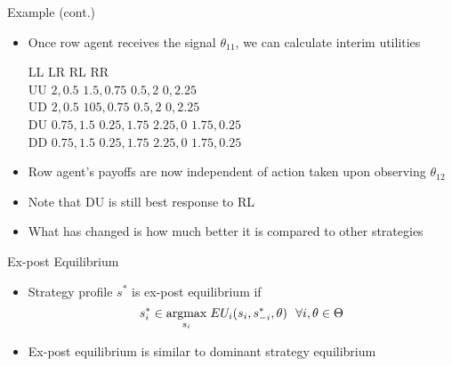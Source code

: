 \documentclass[11pt,aspectratio=169]{beamer}
\begin{document}
  
  \begin{frame}{Example (cont.)}
   \begin{itemize}[<+->]
    \item Once row agent receives the signal $\theta_{11}$, we can calculate interim utilities
    \vspace{1em}
    \begin{center}\small
     \hspace{-4.9em}
     \begin{game}{4}{4}
      	\> LL			\> LR		\> RL		\> RR		\\
      UU	\> $2,0.5$		\> $1.5,0.75$	\> $0.5,2$	\> $0,2.25$	\\
      UD	\> $2,0.5$		\> $105,0.75$ 	\> $0.5,2$	\> $0,2.25$	\\
      DU	\> $0.75,1.5$	\> $0.25,1.75$	\> $2.25,0$	\> $1.75,0.25$	\\
      DD	\> $0.75,1.5$	\> $0.25,1.75$	\> $2.25,0$	\> $1.75,0.25$	\\
     \end{game}
    \end{center}
    \vspace{1em}
    \item Row agent's payoffs are now \alert{independent} of action taken upon observing $\theta_{12}$
    \item Note that DU is \alert{still best response} to RL
    \item What has changed is how much better it is compared to other strategies
   \end{itemize}
  \end{frame}


  \begin{frame}{Ex-post Equilibrium}
    \begin{itemize}[<+->]
    \setlength{\itemsep}{1.2em}
     \item Strategy profile $s^*$ is \alert{ex-post equilibrium} if
     $$s^*_i \in \underset{s_i}{\operatorname*{argmax}} \; EU_i(s_i,s^*_{-i},\theta) ~~ \forall i, \theta \in \Theta$$
     \item Ex-post equilibrium is similar to \alert{dominant strategy equilibrium}
    \end{itemize}
  \end{frame}
  
\end{document}
